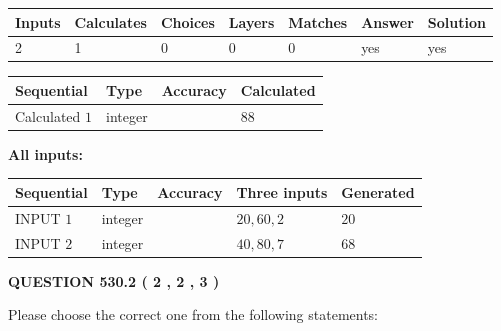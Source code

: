 \documentclass[12pt]{article}
\begin{document}
 
\noindent{}
 
 

 
   
   
   
   
\noindent\begin{tabular}{|l|l|l|l|l|l|l|}
 \hline
Inputs & Calculates & Choices & Layers & Matches & Answer & Solution \\ \hline
 2  & 
 1  & 
 0
  & 
 0  & 
 0  & 
  yes & 
  yes 
  \\ \hline
 \end{tabular}
   
   
   
   
\noindent{}
   
   
  
  
\noindent\begin{tabular}{|l|l|l|l|}
\hline
 Sequential & Type & Accuracy & Calculated \\ 
\hline
 
 
  Calculated $  1 $ & integer &  & 
  $ 88 $ 
 \\  \hline  
 \end{tabular}
   
   
   
   
\noindent\vspace{0.1in}\hspace{-0.08in} {\textbf{\Large{All inputs: }}}
   
   
  
  
\noindent\begin{tabular}{|l|l|l|l|l|}
\hline
 Sequential & Type & Accuracy & Three inputs & Generated \\ 
\hline
 
 
  INPUT $  1 $ & integer &  & $
 20
 , 
 60
 , 
 2
 $ & $ 20 $ 
 \\  \hline  
 
 
  INPUT $  2 $ & integer &  & $
 40
 , 
 80
 , 
 7
 $ & $ 68 $ 
 \\  \hline  
 \end{tabular}
   
   
  
\vspace{0.2in}
  
{\textbf{\Large{QUESTION
530.2 
 ( 2 , 2 , 3 )
}}}
  
  
Please choose the correct one from the following statements:
 
\end{document}
